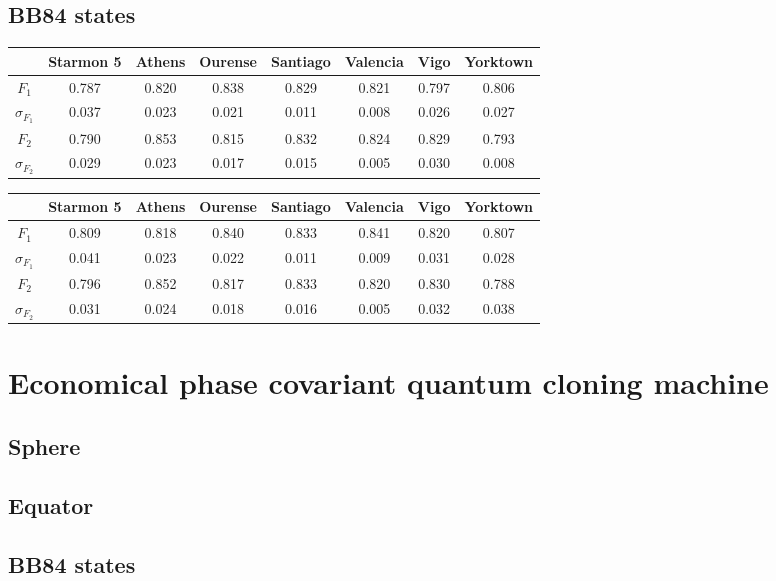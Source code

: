 \subsection{BB84 states}

\begin{table}[H]
    \centering
    \begin{tabular}{|c|c|c|c|c|c|c|c|}
    \hline
    \textbf{} & \textbf{Starmon 5} & \textbf{Athens} & \textbf{Ourense} & \textbf{Santiago} & \textbf{Valencia} & \textbf{Vigo} & \textbf{Yorktown} \\ \hline
    $F_1$              & 0.787 & 0.820 & 0.838 & 0.829 & 0.821 & 0.797 & 0.806 \\ \hline
    $\sigma_{F_1}$     & 0.037 & 0.023 & 0.021 & 0.011 & 0.008 & 0.026 & 0.027 \\ \hline
    $F_2$              & 0.790 & 0.853 & 0.815 & 0.832 & 0.824 & 0.829 & 0.793 \\ \hline
    $\sigma_{F_2}$     & 0.029 & 0.023 & 0.017 & 0.015 & 0.005 & 0.030 & 0.008 \\ \hline
    \end{tabular}
\end{table}

\begin{table}[H]
    \centering
    \begin{tabular}{|c|c|c|c|c|c|c|c|}
    \hline
    \textbf{} & \textbf{Starmon 5} & \textbf{Athens} & \textbf{Ourense} & \textbf{Santiago} & \textbf{Valencia} & \textbf{Vigo} & \textbf{Yorktown} \\ \hline
    $F_1$              & 0.809 & 0.818 & 0.840 & 0.833 & 0.841 & 0.820 & 0.807 \\ \hline
    $\sigma_{F_1}$     & 0.041 & 0.023 & 0.022 & 0.011 & 0.009 & 0.031 & 0.028 \\ \hline
    $F_2$              & 0.796 & 0.852 & 0.817 & 0.833 & 0.820 & 0.830 & 0.788 \\ \hline
    $\sigma_{F_2}$     & 0.031 & 0.024 & 0.018 & 0.016 & 0.005 & 0.032 & 0.038 \\ \hline
    \end{tabular}
\end{table}
\section{Economical phase covariant quantum cloning machine}
\subsection{Sphere}
\subsection{Equator}
\subsection{BB84 states}

